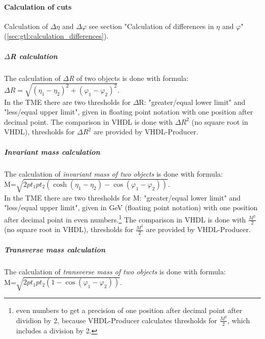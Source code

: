 \paragraph{Calculation of cuts}
\label{sec:gtl:delta_r_calculation}

Calculation of $\Delta\eta$ and $\Delta\varphi$ see section "Calculation of differences in $\eta$ and $\varphi$" (\ref{sec:gtl:calculation_differences}).

\subparagraph{$\Delta$R calculation}
\label{sec:gtl:delta_r_calculation}

The calculation of \textit{$\Delta$R} of two objects is done with formula:\\

$\Delta$$R=\sqrt{(\eta_1-\eta_2)^2+(\varphi_1-\varphi_2)^2}$.\\

In the TME there are two thresholds for $\Delta$R: "greater/equal lower limit" and "less/equal upper limit", given in floating point notation
with one position after decimal point.
The comparison in VHDL is done with $\Delta$$R^2$ (no square root in VHDL), thresholds for $\Delta$$R^2$ are provided by VHDL-Producer.

\subparagraph{Invariant mass calculation}
\label{sec:gtl:inv_mass_calculation}

The calculation of \textit{invariant mass of two objects} is done with formula:\\

M=$\sqrt{2 pt_1  pt_2 (\cosh(\eta_1-\eta_2)-\cos(\varphi_1-\varphi_2))}$.\\

In the TME there are two thresholds for M: "greater/equal lower limit" and "less/equal upper limit", given in GeV (floating point notation) with one position after decimal point in even numbers.\footnote{even numbers to get a precision of one position after decimal point after dividion by 2, because VHDL-Producer calculates thresholds for $\frac{M^2}{2}$, which includes a division by 2.}
The comparison in VHDL is done with $\frac{M^2}{2}$ (no square root in VHDL), thresholds for $\frac{M^2}{2}$ are provided by VHDL-Producer.

\subparagraph{Transverse mass calculation}
\label{sec:gtl:transverse_mass_calculation}

The calculation of \textit{transverse mass of two objects} is done with formula:\\

M=$\sqrt{2 pt_1 pt_2 (1-\cos(\varphi_1-\varphi_2))}$.\\

